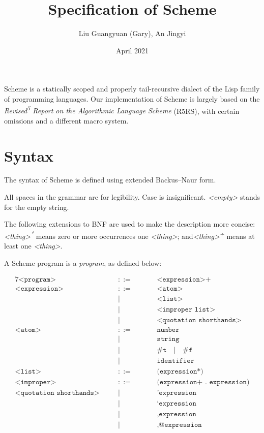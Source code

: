 \documentclass{article}
\title{\textbf{Specification of Scheme}}
\author{Liu Guangyuan (Gary), An Jingyi}
\date{April 2021}
\begin{document}
\maketitle
Scheme is a statically scoped and properly tail-recursive dialect of the Lisp family of programming languages. Our implementation of Scheme is largely based on the \emph{Revised\textsuperscript{5} Report on the Algorithmic Language Scheme} (R5RS), with certain omissions and a different macro system.

\section{Syntax}
The syntax of Scheme is defined using extended Backus–Naur form.

All spaces in the grammar are for legibility. Case is insignificant. \emph{<empty>} stands for the empty string.

The following extensions to BNF are used to make the description more concise: \emph{<thing>\textsuperscript{*}} means zero or more occurrences one \emph{<thing>}; and\emph{<thing>\textsuperscript{+}} means at least one \emph{<thing>}.

A Scheme program is a \emph{program}, as defined below:

\begin{alignat*}{7}
\texttt{<program>}    && \quad ::= &\quad && \texttt{<expression>+} \\
\texttt{<expression>} && \quad ::= &\quad && \texttt{<atom>} \\
                      && \quad |   &\quad && \texttt{<list>} \\
                      && \quad |   &\quad && \texttt{<improper list>} \\
                      && \quad |   &\quad && \texttt{<quotation shorthands>} \\
\texttt{<atom>} && \quad ::= &\quad && \texttt{number} \\
                      && \quad |   &\quad && \texttt{string} \\
                      && \quad |   &\quad && \texttt{\#t} \quad | \quad \texttt{\#f} \\
                      && \quad |   &\quad && \texttt{identifier} \\
\texttt{<list>}     && \quad ::= &\quad && \texttt{(expression*)} \\
\texttt{<improper>} && \quad ::= &\quad && \texttt{(expression+ . expression)} \\
\texttt{<quotation shorthands>} && \quad |   &\quad && \texttt{'expression} \\
                      && \quad |   &\quad && \texttt{`expression} \\
                      && \quad |   &\quad && \texttt{,expression} \\
                      && \quad |   &\quad && \texttt{,@expression} \\
\end{alignat*}
\end{document}

